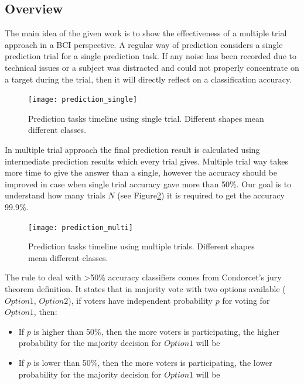 \documentclass[12pt]{article}
\begin{document}
\subsection{Overview}
The main idea of the given work is to show the effectiveness of a multiple trial approach in a BCI perspective. 
A regular way of prediction considers a single prediction trial for a single prediction task. If any noise has been recorded due to technical issues or a subject was distracted and could not properly concentrate on a target during the trial, then it will directly reflect on a classification accuracy.
\begin{figure} [H]
\begin{center}
\texttt{[image: prediction\_single]}
\caption{Prediction tasks timeline using single trial. Different shapes mean different classes.}
\label{fig:fnCompModel}
\end{center}
\end{figure}

In multiple trial approach the final prediction result is calculated using intermediate prediction results which every trial gives. Multiple trial way takes more time to give the answer than a single, however the accuracy should be improved in case when single trial accuracy gave more than 50\%. Our goal is to understand how many trials $N$ (see Figure\ref{fig:prediction_multi}) it is required to get the accuracy 99.9\%.
\begin{figure} [H]
\begin{center}
\texttt{[image: prediction\_multi]}
\caption{Prediction tasks timeline using multiple trials. Different shapes mean different classes.}
\label{fig:prediction_multi}
\end{center}
\end{figure}

The rule to deal with >50\% accuracy classifiers comes from Condorcet's jury theorem definition. It states that in majority vote with two options available ($Option1$, $Option2$), if voters have independent probability $p$ for voting for $Option1$, then:
\begin{itemize}
\item If $p$ is higher than 50\%, then the more voters is participating, the higher probability for the majority decision for $Option1$ will be
\item If $p$ is lower than 50\%, then the more voters is participating, the lower probability for the majority decision for $Option1$ will be
\end{itemize}
\end{document}
